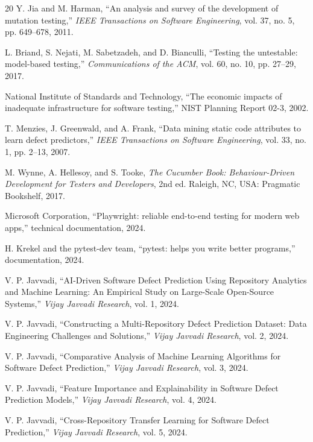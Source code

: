 \documentclass[conference]{IEEEtran}
\begin{document}
\begin{thebibliography}{20}
Y. Jia and M. Harman, ``An analysis and survey of the development of mutation testing,'' \textit{IEEE Transactions on Software Engineering}, vol. 37, no. 5, pp. 649--678, 2011.

L. Briand, S. Nejati, M. Sabetzadeh, and D. Bianculli, ``Testing the untestable: model-based testing,'' \textit{Communications of the ACM}, vol. 60, no. 10, pp. 27--29, 2017.

National Institute of Standards and Technology, ``The economic impacts of inadequate infrastructure for software testing,'' NIST Planning Report 02-3, 2002.

T. Menzies, J. Greenwald, and A. Frank, ``Data mining static code attributes to learn defect predictors,'' \textit{IEEE Transactions on Software Engineering}, vol. 33, no. 1, pp. 2--13, 2007.

M. Wynne, A. Hellesoy, and S. Tooke, \textit{The Cucumber Book: Behaviour-Driven Development for Testers and Developers}, 2nd ed. Raleigh, NC, USA: Pragmatic Bookshelf, 2017.

Microsoft Corporation, ``Playwright: reliable end-to-end testing for modern web apps,'' technical documentation, 2024.

H. Krekel and the pytest-dev team, ``pytest: helps you write better programs,'' documentation, 2024.

V. P. Javvadi, ``AI-Driven Software Defect Prediction Using Repository Analytics and Machine Learning: An Empirical Study on Large-Scale Open-Source Systems,'' \textit{Vijay Javvadi Research}, vol. 1, 2024.

V. P. Javvadi, ``Constructing a Multi-Repository Defect Prediction Dataset: Data Engineering Challenges and Solutions,'' \textit{Vijay Javvadi Research}, vol. 2, 2024.

V. P. Javvadi, ``Comparative Analysis of Machine Learning Algorithms for Software Defect Prediction,'' \textit{Vijay Javvadi Research}, vol. 3, 2024.

V. P. Javvadi, ``Feature Importance and Explainability in Software Defect Prediction Models,'' \textit{Vijay Javvadi Research}, vol. 4, 2024.

V. P. Javvadi, ``Cross-Repository Transfer Learning for Software Defect Prediction,'' \textit{Vijay Javvadi Research}, vol. 5, 2024.


\end{thebibliography}
\end{document}
